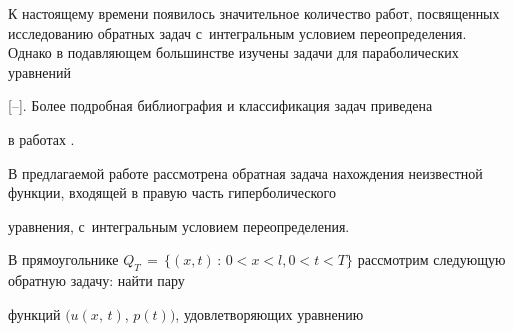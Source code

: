 











\date{25/IV/2011}






\maketitle



 К настоящему времени появилось значительное количество работ, посвященных исследованию обратных задач с~интегральным условием переопределения. Однако в подавляющем большинстве изучены задачи для параболических уравнений

[--]. Более подробная библиография и классификация задач приведена

в работах \cite{Kozhanov:smj-2005,Prilepko-Tkachenko:zhvm2003}.



В предлагаемой работе рассмотрена обратная задача нахождения неизвестной функции, входящей в правую часть гиперболического

уравнения, с~интегральным условием переопределения.



\smallskip



 В прямоугольнике \mbox{$Q_T\,{=}\,\{(x,t)\,{:}\, 0<x<l, 0<t<T\}$} рассмотрим следующую обратную задачу: найти пару

функций $(u(x,\,t)$, $p(t))$, удовлетворяющих уравнению

